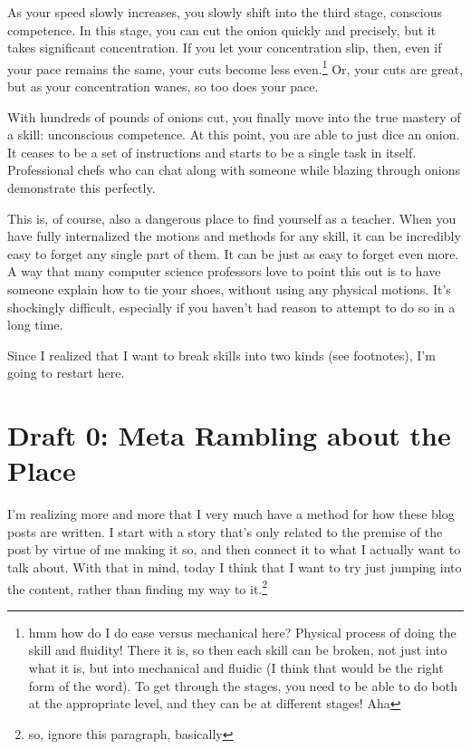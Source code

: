 \documentclass[12pt]{article}
\renewcommand{\,}{\textsuperscript{,}}
\begin{document}
As your speed slowly increases, you slowly shift into the third stage, conscious competence.  
In this stage, you can cut the onion quickly and precisely, but it takes significant concentration.  
If you let your concentration slip, then, even if your pace remains the same, your cuts become less even.\footnote{hmm how do I do ease versus mechanical here? Physical process of doing the skill and fluidity! There it is, so then each skill can be broken, not just into what it is, but into mechanical and fluidic (I think that would be the right form of the word). To get through the stages, you need to be able to do both at the appropriate level, and they can be at different stages! Aha}  
Or, your cuts are great, but as your concentration wanes, so too does your pace.

With hundreds of pounds of onions cut, you finally move into the true mastery of a skill: unconscious competence.  
At this point, you are able to just dice an onion.  
It ceases to be a set of instructions and starts to be a single task in itself.  
Professional chefs who can chat along with someone while blazing through onions demonstrate this perfectly.

This is, of course, also a dangerous place to find yourself as a teacher.  
When you have fully internalized the motions and methods for any skill, it can be incredibly easy to forget any single part of them.  
It can be just as easy to forget even more.  
A way that many computer science professors love to point this out is to have someone explain how to tie your shoes, without using any physical motions.  
It's shockingly difficult, especially if you haven't had reason to attempt to do so in a long time.

Since I realized that I want to break skills into two kinds (see footnotes), I'm going to restart here.

\section{Draft 0: Meta Rambling about the Place}

I'm realizing more and more that I very much have a method for how these blog posts are written.  
I start with a story that's only related to the premise of the post by virtue of me making it so, and then connect it to what I actually want to talk about.  
With that in mind, today I think that I want to try just jumping into the content, rather than finding my way to it.\footnote{so, ignore this paragraph, basically}
\end{document}
